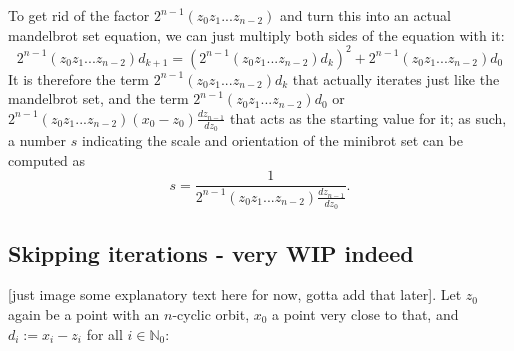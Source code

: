 \documentclass[12pt,a4paper]{article}
\begin{document}
To get rid of the factor $2^{n-1}(z_0z_1...z_{n-2})$ and turn this into an actual mandelbrot set equation, we can just multiply both sides of the equation with it:
$$2^{n-1}(z_0z_1...z_{n-2})d_{k+1}=(2^{n-1}(z_0z_1...z_{n-2})d_k)^2+2^{n-1}(z_0z_1...z_{n-2})d_0$$
It is therefore the term $2^{n-1}(z_0z_1...z_{n-2})d_k$ that actually iterates just like the mandelbrot set, and the term $2^{n-1}(z_0z_1...z_{n-2})d_0$ or $2^{n-1}(z_0z_1...z_{n-2})(x_0-z_0)\frac{dz_{n-1}}{dz_0}$ that acts as the starting value for it; as such, a number $s$ indicating the scale and orientation of the minibrot set can be computed as $$s=\frac{1}{2^{n-1}(z_0z_1...z_{n-2})\frac{dz_{n-1}}{dz_0}}.$$

\subsection{Skipping iterations - very WIP indeed}


[just image some explanatory text here for now, gotta add that later]. Let $z_0$ again be a point with an $n$-cyclic orbit, $x_0$ a point very close to that, and $d_i:=x_i-z_i$ for all $i\in\mathbb{N}_0$: 
\end{document}
